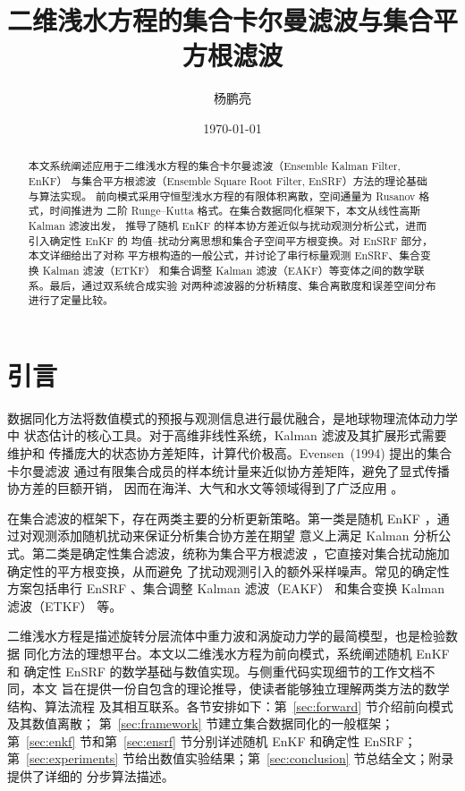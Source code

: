 \documentclass[12pt,a4paper]{article}
\title{二维浅水方程的集合卡尔曼滤波与集合平方根滤波}
\author{杨鹏亮}
\date{\today}
\begin{document}
\maketitle

\begin{abstract}
本文系统阐述应用于二维浅水方程的集合卡尔曼滤波（Ensemble Kalman Filter, EnKF）
与集合平方根滤波（Ensemble Square Root Filter, EnSRF）方法的理论基础与算法实现。
前向模式采用守恒型浅水方程的有限体积离散，空间通量为 Rusanov 格式，时间推进为
二阶 Runge--Kutta 格式。在集合数据同化框架下，本文从线性高斯 Kalman 滤波出发，
推导了随机 EnKF 的样本协方差近似与扰动观测分析公式，进而引入确定性 EnKF 的
均值--扰动分离思想和集合子空间平方根变换。对 EnSRF 部分，本文详细给出了对称
平方根构造的一般公式，并讨论了串行标量观测 EnSRF、集合变换 Kalman 滤波（ETKF）
和集合调整 Kalman 滤波（EAKF）等变体之间的数学联系。最后，通过双系统合成实验
对两种滤波器的分析精度、集合离散度和误差空间分布进行了定量比较。
\end{abstract}

\tableofcontents

\section{引言}

数据同化方法将数值模式的预报与观测信息进行最优融合，是地球物理流体动力学中
状态估计的核心工具。对于高维非线性系统，Kalman 滤波及其扩展形式需要维护和
传播庞大的状态协方差矩阵，计算代价极高。Evensen~(1994) 提出的集合卡尔曼滤波
通过有限集合成员的样本统计量来近似协方差矩阵，避免了显式传播协方差的巨额开销，
因而在海洋、大气和水文等领域得到了广泛应用 \cite{evensen1994sequential}。

在集合滤波的框架下，存在两类主要的分析更新策略。第一类是随机 EnKF
\cite{burgers1998analysis}，通过对观测添加随机扰动来保证分析集合协方差在期望
意义上满足 Kalman 分析公式。第二类是确定性集合滤波，统称为集合平方根滤波
\cite{tippett2003ensemble}，它直接对集合扰动施加确定性的平方根变换，从而避免
了扰动观测引入的额外采样噪声。常见的确定性方案包括串行 EnSRF
\cite{whitaker2002ensemble}、集合调整 Kalman 滤波（EAKF）
\cite{anderson2001ensemble} 和集合变换 Kalman 滤波（ETKF）
\cite{bishop2001adaptive} 等。

二维浅水方程是描述旋转分层流体中重力波和涡旋动力学的最简模型，也是检验数据
同化方法的理想平台。本文以二维浅水方程为前向模式，系统阐述随机 EnKF 和
确定性 EnSRF 的数学基础与数值实现。与侧重代码实现细节的工作文档不同，本文
旨在提供一份自包含的理论推导，使读者能够独立理解两类方法的数学结构、算法流程
及其相互联系。各节安排如下：第~\ref{sec:forward} 节介绍前向模式及其数值离散；
第~\ref{sec:framework} 节建立集合数据同化的一般框架；第~\ref{sec:enkf}
节和第~\ref{sec:ensrf} 节分别详述随机 EnKF 和确定性 EnSRF；第~\ref{sec:experiments}
节给出数值实验结果；第~\ref{sec:conclusion} 节总结全文；附录提供了详细的
分步算法描述。
\end{document}
